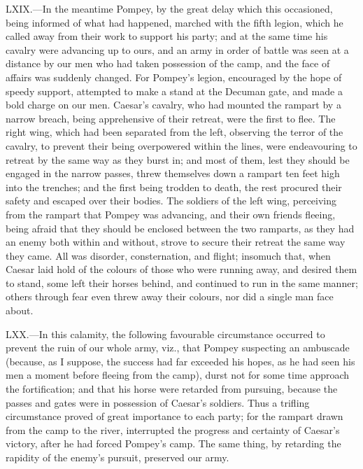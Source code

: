 LXIX.—In the meantime Pompey, by the great delay which this occasioned,
being informed of what had happened, marched with the fifth legion,
which he called away from their work to support his party; and at the
same time his cavalry were advancing up to ours, and an army in order of
battle was seen at a distance by our men who had taken possession of the
camp, and the face of affairs was suddenly changed. For Pompey's legion,
encouraged by the hope of speedy support, attempted to make a stand at
the Decuman gate, and made a bold charge on our men. Caesar's cavalry,
who had mounted the rampart by a narrow breach, being apprehensive of
their retreat, were the first to flee. The right wing, which had been
separated from the left, observing the terror of the cavalry, to prevent
their being overpowered within the lines, were endeavouring to retreat
by the same way as they burst in; and most of them, lest they should be
engaged in the narrow passes, threw themselves down a rampart ten feet
high into the trenches; and the first being trodden to death, the rest
procured their safety and escaped over their bodies. The soldiers of the
left wing, perceiving from the rampart that Pompey was advancing, and
their own friends fleeing, being afraid that they should be enclosed
between the two ramparts, as they had an enemy both within and without,
strove to secure their retreat the same way they came. All was disorder,
consternation, and flight; insomuch that, when Caesar laid hold of the
colours of those who were running away, and desired them to stand, some
left their horses behind, and continued to run in the same manner;
others through fear even threw away their colours, nor did a single man
face about.

LXX.—In this calamity, the following favourable circumstance occurred
to prevent the ruin of our whole army, viz., that Pompey suspecting an
ambuscade (because, as I suppose, the success had far exceeded his
hopes, as he had seen his men a moment before fleeing from the camp),
durst not for some time approach the fortification; and that his horse
were retarded from pursuing, because the passes and gates were in
possession of Caesar's soldiers. Thus a trifling circumstance proved of
great importance to each party; for the rampart drawn from the camp to
the river, interrupted the progress and certainty of Caesar's victory,
after he had forced Pompey's camp. The same thing, by retarding the
rapidity of the enemy's pursuit, preserved our army.

